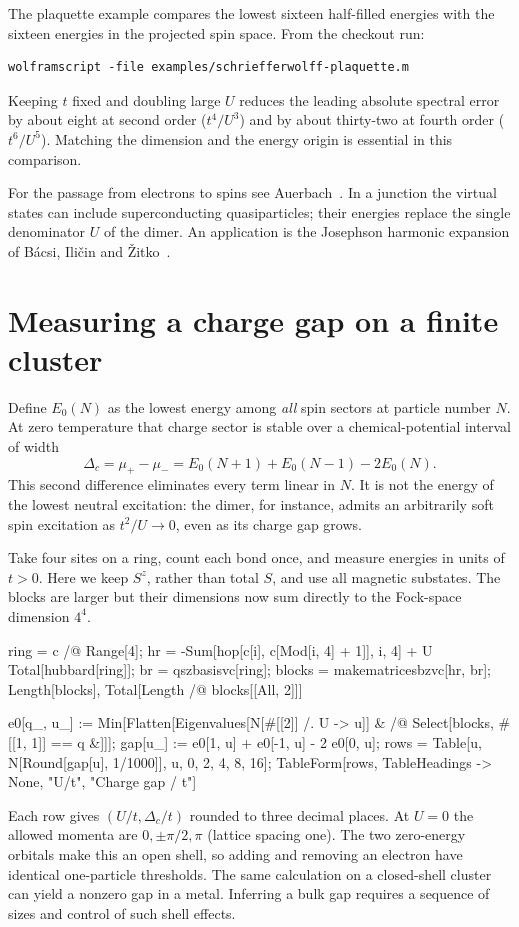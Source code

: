 The plaquette example compares the lowest sixteen half-filled energies
with the sixteen energies in the projected spin space. From the
checkout run:
\begin{lstlisting}[style=wl]
wolframscript -file examples/schriefferwolff-plaquette.m
\end{lstlisting}
Keeping $t$ fixed and doubling large $U$ reduces the leading
absolute spectral error by about eight at second order ($t^4/U^3$)
and by about thirty-two at fourth order ($t^6/U^5$). Matching the
dimension and the energy origin is essential in this comparison.

\begin{furtherreading}
For the passage from electrons to spins see Auerbach~\cite{auerbach}.
In a junction the virtual states can include superconducting
quasiparticles; their energies replace the single denominator $U$ of
the dimer. An application is the Josephson harmonic expansion of
Bácsi, Iličin and Žitko~\cite{bacsi}.
\end{furtherreading}

\section{Measuring a charge gap on a finite cluster}
Define $E_0(N)$ as the lowest energy among \emph{all} spin sectors
at particle number $N$. At zero temperature that charge sector is stable
over a chemical-potential interval of width
\begin{equation}
 \Delta_c=\mu_+-\mu_-
 = E_0(N+1)+E_0(N-1)-2E_0(N).
 \label{eq:chargegap}
\end{equation}
This second difference eliminates every term linear in $N$. It is
not the energy of the lowest neutral excitation: the dimer, for
instance, admits an arbitrarily soft spin excitation as $t^2/U\to0$,
even as its charge gap grows.

Take four sites on a ring, count each bond once, and measure energies in
units of $t>0$. Here we keep $S^z$, rather than total $S$, and use all
magnetic substates. The blocks are larger but their dimensions now sum
directly to the Fock-space dimension $4^4$.
\begin{wl}
ring = c /@ Range[4];
hr = -Sum[hop[c[i], c[Mod[i, 4] + 1]], {i, 4}] +
  U Total[hubbard[ring]];
br = qszbasisvc[ring];
blocks = makematricesbzvc[hr, br];
{Length[blocks], Total[Length /@ blocks[[All, 2]]]}
\end{wl}
\begin{wl}
e0[q_, u_] := Min[Flatten[Eigenvalues[N[#[[2]] /. U -> u]] & /@
  Select[blocks, #[[1, 1]] == q &]]];
gap[u_] := e0[1, u] + e0[-1, u] - 2 e0[0, u];
rows = Table[{u, N[Round[gap[u], 1/1000]]}, {u, {0, 2, 4, 8, 16}}];
TableForm[rows, TableHeadings -> {None, {"U/t", "Charge gap / t"}}]
\end{wl}
Each row gives $(U/t,\Delta_c/t)$ rounded to three decimal places.
At $U=0$ the allowed momenta are $0,\pm\pi/2,\pi$ (lattice spacing
one). The two zero-energy orbitals make this an open shell, so adding
and removing an electron have identical one-particle thresholds.
The same calculation on a closed-shell cluster can yield a nonzero
gap in a metal. Inferring a bulk gap requires a sequence of sizes
and control of such shell effects.


